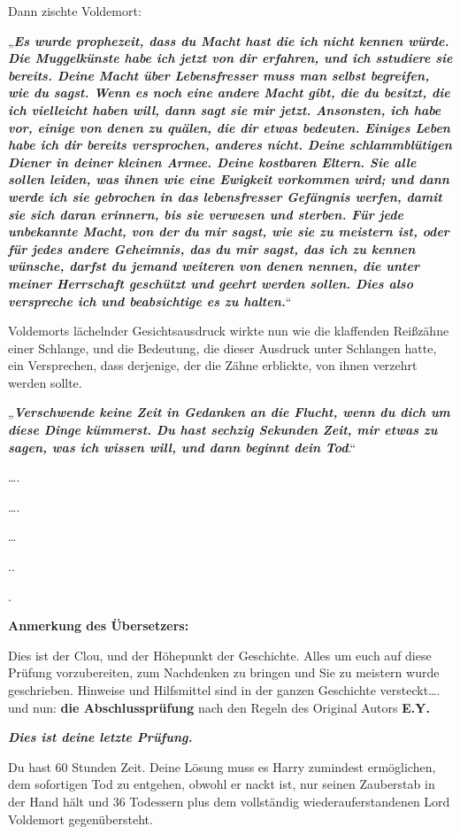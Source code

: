 {Dann zischte Voldemort:

„\textbf{\emph{Es wurde prophezeit, dass du Macht hast die ich nicht kennen würde. Die Muggelkünste habe ich jetzt von dir erfahren, und ich sstudiere sie bereits. Deine Macht über Lebensfresser muss man selbst begreifen, wie du sagst. Wenn es noch eine andere Macht gibt, die du besitzt, die ich vielleicht haben will, dann sagt sie mir jetzt. Ansonsten, ich habe vor, einige von denen zu quälen, die dir etwas bedeuten. Einiges Leben habe ich dir bereits versprochen, anderes nicht. Deine schlammblütigen Diener in deiner kleinen Armee. Deine kostbaren Eltern. Sie alle sollen leiden, was ihnen wie eine Ewigkeit vorkommen wird; und dann werde ich sie gebrochen in das lebensfresser Gefängnis werfen, damit sie sich daran erinnern, bis sie verwesen und sterben. Für jede unbekannte Macht, von der du mir sagst, wie sie zu meistern ist, oder für jedes andere Geheimnis, das du mir sagst, das ich zu kennen wünsche, darfst du jemand weiteren von denen nennen, die unter meiner Herrschaft geschützt und geehrt werden sollen. Dies also verspreche ich und beabsichtige es zu halten.}}“

Voldemorts lächelnder Gesichtsausdruck wirkte nun wie die klaffenden Reißzähne einer Schlange, und die Bedeutung, die dieser Ausdruck unter Schlangen hatte, ein Versprechen, dass derjenige, der die Zähne erblickte, von ihnen verzehrt werden sollte.

„\textbf{\emph{Verschwende keine Zeit in Gedanken an die Flucht, wenn du dich um diese Dinge kümmerst. Du hast sechzig Sekunden Zeit, mir etwas zu sagen, was ich wissen will, und dann beginnt dein Tod}}.“

….

….

…

..

.

\textbf{Anmerkung des Übersetzers:}

Dies ist der Clou, und der Höhepunkt der Geschichte. Alles um euch auf diese Prüfung vorzubereiten, zum Nachdenken zu bringen und Sie zu meistern wurde geschrieben. Hinweise und Hilfsmittel sind in der ganzen Geschichte versteckt…. und nun: \textbf{die Abschlussprüfung} nach den Regeln des Original Autors \textbf{E.Y.}

\emph{\hfill\break \textbf{Dies ist deine letzte Prüfung.}}

Du hast 60 Stunden Zeit. Deine Lösung muss es Harry zumindest ermöglichen, dem sofortigen Tod zu entgehen, obwohl er nackt ist, nur seinen Zauberstab in der Hand hält und 36 Todessern plus dem vollständig wiederauferstandenen Lord Voldemort gegenübersteht.

}

